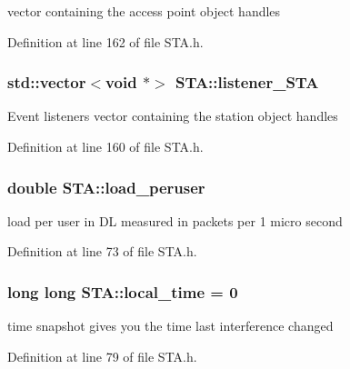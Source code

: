 vector containing the access point object handles 



Definition at line 162 of file S\-T\-A.\-h.

\hypertarget{classSTA_aee34ffb68253dca6db2b1f52206a5f3e}{
\subsubsection[{listener\-\_\-\-S\-T\-A}]{\setlength{\rightskip}{0pt plus 5cm}std\-::vector$<$void $\ast$$>$ S\-T\-A\-::listener\-\_\-\-S\-T\-A}}\label{classSTA_aee34ffb68253dca6db2b1f52206a5f3e}
Event listeners vector containing the station object handles 

Definition at line 160 of file S\-T\-A.\-h.

\hypertarget{classSTA_ab95904d5e62ea7cfe15488e8a2d7b56e}{
\subsubsection[{load\-\_\-peruser}]{\setlength{\rightskip}{0pt plus 5cm}double S\-T\-A\-::load\-\_\-peruser\hspace{0.3cm}{\ttfamily [private]}}}\label{classSTA_ab95904d5e62ea7cfe15488e8a2d7b56e}


load per user in D\-L measured in packets per 1 micro second 



Definition at line 73 of file S\-T\-A.\-h.

\hypertarget{classSTA_ad4800b03ee83fe283cc33089eb438359}{
\subsubsection[{local\-\_\-time}]{\setlength{\rightskip}{0pt plus 5cm}long long S\-T\-A\-::local\-\_\-time = 0\hspace{0.3cm}{\ttfamily [private]}}}\label{classSTA_ad4800b03ee83fe283cc33089eb438359}


time snapshot gives you the time last interference changed 



Definition at line 79 of file S\-T\-A.\-h.

